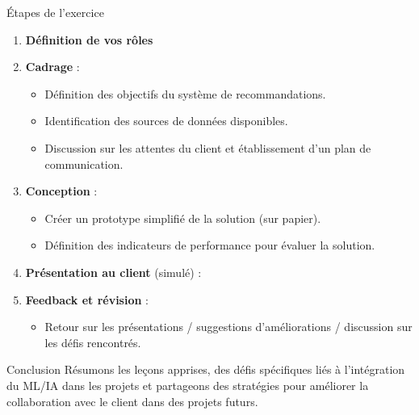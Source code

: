 \begin{frame}{Étapes de l'exercice}

  \begin{enumerate}
  \item \textbf{Définition de vos rôles}
  \item \textbf{Cadrage} :
    \begin{itemize}
    \item Définition des objectifs du système de recommandations.
    \item Identification des sources de données disponibles.
    \item Discussion sur les attentes du client et établissement d'un
      plan de communication.
    \end{itemize}
  \item \textbf{Conception} :
    \begin{itemize}
    \item Créer un prototype simplifié de la solution (sur papier).
    \item Définition des indicateurs de performance pour évaluer la
      solution.
    \end{itemize}
  \item \textbf{Présentation au client} (simulé) :
  \item \textbf{Feedback et révision} :
    \begin{itemize}
    \item Retour sur les présentations / suggestions d'améliorations /
      discussion sur les défis rencontrés.
    \end{itemize}
  \end{enumerate}
\end{frame}

\begin{frame}{Conclusion}
  Résumons les leçons apprises, des défis spécifiques liés à
  l'intégration du ML/IA dans les projets et partageons des stratégies
  pour améliorer la collaboration avec le client dans des projets
  futurs.
\end{frame}


